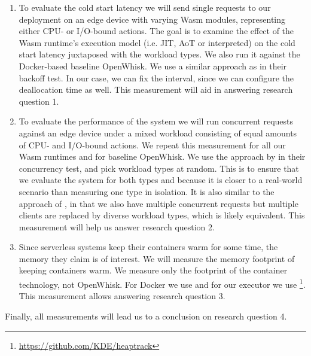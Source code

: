 \begin{enumerate}
    \item To evaluate the cold start latency we will send single requests to our deployment on an edge device with varying Wasm modules, representing either CPU- or I/O-bound actions. The goal is to examine the effect of the Wasm runtime's execution model (i.e. JIT, AoT or interpreted) on the cold start latency juxtaposed with the workload types. We also run it against the Docker-based baseline OpenWhisk. We use a similar approach as \citeauthor{McGrath2017} in their backoff test. In our case, we can fix the interval, since we can configure the deallocation time as well. This measurement will aid in answering research question 1.
    \item To evaluate the performance of the system we will run concurrent requests against an edge device under a mixed workload consisting of equal amounts of CPU- and I/O-bound actions. We repeat this measurement for all our Wasm runtimes and for baseline OpenWhisk. We use the approach by \citeauthor{McGrath2017} in their concurrency test, and pick workload types at random. This is to ensure that we evaluate the system for both types and because it is closer to a real-world scenario than measuring one type in isolation. It is also similar to the approach of \citeauthor{Hall2019}, in that we also have multiple concurrent requests but multiple clients are replaced by diverse workload types, which is likely equivalent. This measurement will help us answer research question 2.
    \item Since serverless systems keep their containers warm for some time, the memory they claim is of interest. We will measure the memory footprint of keeping containers warm.  We measure only the footprint of the container technology, not OpenWhisk. For Docker we use  and for our executor we use  \footnote{\url{https://github.com/KDE/heaptrack}}. This measurement allows answering research question 3.
\end{enumerate}

Finally, all measurements will lead us to a conclusion on research question 4.
